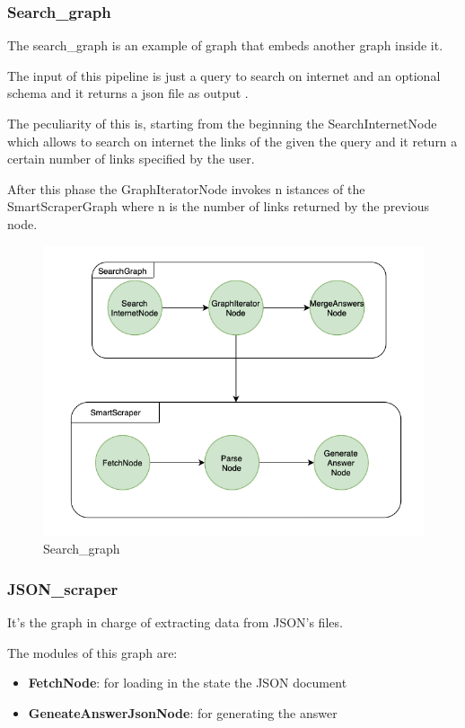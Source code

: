 \subsubsection{Search\_graph}
The search\_graph is an example of graph that embeds another graph inside it.

The input of this pipeline is just a query to search on internet and an optional schema and it returns a json file as output .

The peculiarity of this is, starting from the beginning the SearchInternetNode which allows to search on internet the links of the given the query and it return a certain number of links specified by the user.

After this phase the GraphIteratorNode invokes n istances of the SmartScraperGraph where n is the number of links returned by the previous node.
\begin{figure}[H]
    \centering
    \includegraphics[width=1\linewidth]{Assets/search_graph.png}
    \caption{Search\_graph}
    \label{fig:enter-label}
\end{figure}
\subsubsection{JSON\_scraper}
It's the graph in charge of extracting data from JSON's files.

The modules of this graph are: 
\begin{itemize}
    \item \textbf{FetchNode}: for loading in the state the JSON document 
    \item \textbf{GeneateAnswerJsonNode}: for generating the answer 
\end{itemize}

